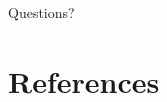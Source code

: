 \documentclass[xcolor={svgnames},aspectratio=169]{beamer}
\begin{document}



\begin{frame}
    \centering
    \Huge
    Questions?
\end{frame}

\section{References}

\renewcommand*{\bibfont}{\tiny}
\frame[allowframebreaks]{\printbibliography}
\end{document}
